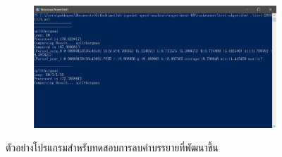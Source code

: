 \begin{figure}[H]
    \centering
    \begin{subfigure}{0.8\linewidth}
        \centering
        \includegraphics[width=1\linewidth]{image/software_appendix/lab_remove.png}
    \end{subfigure}
    \caption{ตัวอย่างโปรแกรมสำหรับทดสอบการลบคำบรรยายที่พัฒนาขึ้น}
\end{figure}